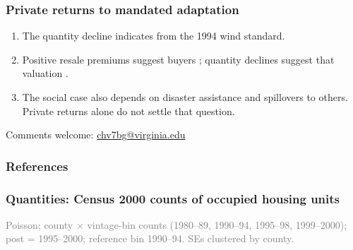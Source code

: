 \documentclass[11pt,xcolor={dvipsnames},hyperref={pdftex,pdfpagemode=UseNone,hidelinks,pdfdisplaydoctitle=true},usepdftitle=false,aspectratio=169]{beamer}
\newcommand{\gc}[1]{{\footnotesize\textcolor{gray}{#1}}}
\begin{document}


\begin{frame}
    \frametitle{Private returns to mandated adaptation}
    \begin{enumerate}\setlength{\itemsep}{1em}
        \item The quantity decline indicates  from the 1994 wind standard.
        \item Positive resale premiums suggest buyers ; quantity declines suggest that valuation .
        \item The social case also depends on disaster assistance and spillovers to others. Private returns alone do not settle that question.
    \end{enumerate}
\end{frame}

\begin{frame}

    \vspace{3em}

    \normalsize{Comments welcome:} \url{chv7bg@virginia.edu}
\end{frame}

\begin{frame}[allowframebreaks=0.8]
    \frametitle{References}
    \tiny{
    
    
    }
\end{frame}


\appendix

\begin{frame}
\end{frame}

\begin{frame}\label{frame:census-quantity}
    \frametitle{Quantities: Census 2000 counts of occupied housing units}
    \begin{table}
    \centering
    \resizebox*{!}{0.72\textheight}{}
    \end{table}

    \gc{Poisson; county $\times$ vintage-bin counts (1980--89, 1990--94, 1995--98, 1999--2000); post = 1995--2000; reference bin 1990--94. SEs clustered by county.}
    \hfill \hyperlink{frame:quantity-static}{}
\end{frame}
\end{document}

